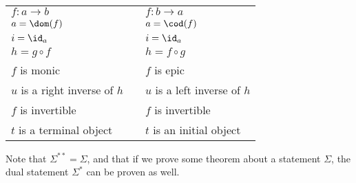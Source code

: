 \documentclass[nocover]{pset}
\begin{document}
\begin{adjustwidth}{1em}{1em}
\begin{definition}[Duality]
\begin{table}[H]
\begin{tabular}{@{}lll@{}}
        $f : a \to b$ && $f : b \to a$  \\
        $a = \dom(f)$ && $a = \cod(f)$ \\
        $i = \id_a$ && $i = \id_a$ \\
        $h = g \circ f$ && $h = f \circ g$ \\
        $f$ is monic && $f$ is epic \\
        $u$ is a right inverse of $h$ && $u$ is a left inverse of $h$
        \\
        $f$ is invertible && $f$ is invertible \\
        $t$ is a terminal object && $t$ is an initial object\\
        \bottomrule
      \end{tabular}
    \end{table}
  \end{definition}
  Note that $\Sigma^{**} = \Sigma$, and that if we prove some theorem
  about a statement $\Sigma$, the dual statement $\Sigma^*$ can be
  proven as well.

\end{adjustwidth}
\end{document}
